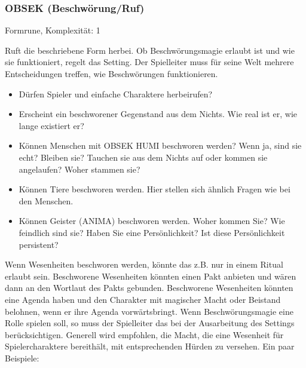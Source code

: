 \documentclass{article}
\begin{document}
\subsubsection{OBSEK (Beschwörung/Ruf)}

Formrune, Komplexität: 1

Ruft die beschriebene Form herbei. Ob Beschwörungsmagie erlaubt ist und wie sie funktioniert, regelt das Setting.
Der Spielleiter muss für seine Welt mehrere Entscheidungen treffen, wie Beschwörungen funktionieren.

\begin{itemize}
\item Dürfen Spieler und einfache Charaktere herbeirufen?
\item Erscheint ein beschworener Gegenstand aus dem Nichts. Wie real ist er, wie lange existiert er?
\item Können Menschen mit OBSEK HUMI beschworen werden? Wenn ja, sind sie echt? Bleiben sie? Tauchen sie aus dem Nichts auf oder kommen sie angelaufen? Woher stammen sie?
\item Können Tiere beschworen werden. Hier stellen sich ähnlich Fragen wie bei den Menschen.
\item Können Geister (ANIMA) beschworen werden. Woher kommen Sie? Wie feindlich sind sie? Haben Sie eine Persönlichkeit? Ist diese Persönlichkeit persistent?
\end{itemize}

Wenn Wesenheiten beschworen werden, könnte das z.B. nur in einem Ritual erlaubt sein. Beschworene Wesenheiten könnten
einen Pakt anbieten und wären dann an den Wortlaut des Pakts gebunden. Beschworene Wesenheiten könnten eine Agenda
haben und den Charakter mit magischer Macht oder Beistand belohnen, wenn er ihre Agenda vorwärtsbringt. Wenn
Beschwörungsmagie eine Rolle spielen soll, so muss der Spielleiter das bei der Ausarbeitung des Settings
berücksichtigen. Generell wird empfohlen, die Macht, die eine Wesenheit für Spielercharaktere bereithält, mit
entsprechenden Hürden zu versehen. Ein paar Beispiele:
\end{document}
